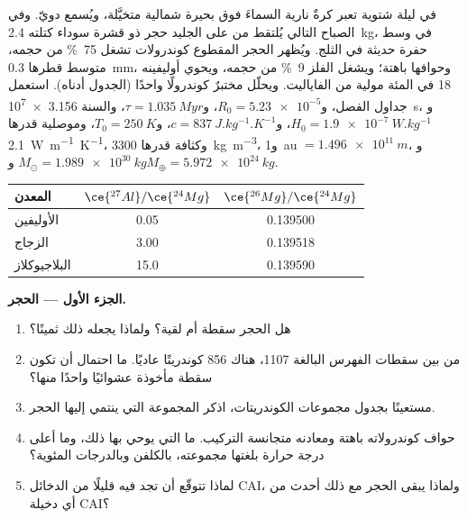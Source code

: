 \begin{problem}
\label{pb:b2:planet-formation-meteorites:1}
في ليلة شتوية تعبر كرةٌ نارية السماءَ فوق بحيرة شمالية متخيَّلة،
ويُسمع دويّ. وفي الصباح التالي يُلتقط من على الجليد حجر ذو قشرة سوداء كتلته \qty{2.4}{kg}،
في وسط حفرة حديثة في الثلج. ويُظهر الحجر المقطوع
كوندرولات تشغل \qty{75}{\percent} من حجمه، متوسط قطرها \qty{0.3}{mm}،
وحوافها باهتة؛ ويشغل الفلز \qty{9}{\percent} من
حجمه، ويحوي أوليفينه 18 في المئة مولية من الفاياليت. ويحلّل مختبرٌ
كوندرولًا واحدًا (الجدول أدناه). استعمل جداول الفصل،
و$R_0 = \num{5.23e-5}$، و$\tau = \qty{1.035}{Myr}$، والسنة \qty{3.156e7}{s}،
و$H_0 = \qty{1.9e-7}{W.kg^{-1}}$، و$c = \qty{837}{J.kg^{-1}.K^{-1}}$،
و$T_0 = \qty{250}{K}$، وموصلية قدرها \qty{2.1}{W.m^{-1}.K^{-1}}، وكثافة قدرها
\qty{3300}{kg.m^{-3}}، و\qty{1}{au} $= \qty{1.496e11}{m}$،
و$M_\odot = \qty{1.989e30}{kg}$ و$M_\oplus = \qty{5.972e24}{kg}$.

\begin{center}
\small
\begin{tabular}{lcc}
\hline
المعدن & $\ce{^{27}Al}/\ce{^{24}Mg}$ & $\ce{^{26}Mg}/\ce{^{24}Mg}$\\
\hline
الأوليفين & 0.05 & \num{0.139500}\\
الزجاج & 3.00 & \num{0.139518}\\
البلاجيوكلاز & 15.0 & \num{0.139590}\\
\hline
\end{tabular}
\end{center}

\medskip
\noindent\textbf{الجزء الأول --- الحجر.}
\begin{enumerate}
  \item هل الحجر سقطة أم لقية؟ ولماذا يجعله ذلك ثمينًا؟
  \item من بين سقطات الفهرس البالغة \num{1107}، هناك 856 كوندريتًا عاديًا. ما
        احتمال أن تكون سقطة مأخوذة عشوائيًا واحدًا منها؟
  \item مستعينًا بجدول مجموعات الكوندريتات، اذكر المجموعة التي ينتمي إليها الحجر.
  \item حواف كوندرولاته باهتة ومعادنه متجانسة
        التركيب. ما  التي يوحي بها ذلك، وما
        أعلى درجة حرارة بلغتها مجموعته، بالكلفن وبالدرجات المئوية؟
  \item لماذا تتوقّع أن تجد فيه قليلًا من الدخائل CAI، ولماذا يبقى الحجر مع ذلك
        أحدث من أي دخيلة CAI؟
\end{enumerate}


\end{problem}
